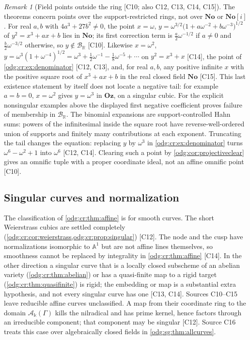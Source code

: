 \documentclass[11pt,oneside]{article}
\numberwithin{equation}{section}
\theoremstyle{definition}
\theoremstyle{remark}
\newtheorem{remark}[remark]{Remark}
\newcommand{\No}{\mathbf{No}}
\newcommand{\Oz}{\mathbf{Oz}}
\newcommand{\R}{\mathbb R}
\newcommand{\BR}{\mathcal B_{\R}}
\newcommand{\src}[1]{\textup{\textsf{\small[#1]}}}
\newcommand{\crA}{\mathcal A_\Bbbk(\Gamma)}
\newcommand{\Aff}{\mathbb A}
\begin{document}
\begin{remark}[Field points outside the ring \src{C10; also C12, C13, C14, C15}]\label{odg:cr:rem:fieldpoints}
The theorems concern points over the support-restricted rings, not over $\No$ or
$\No[i]$. For real $a,b$ with $4a^3+27b^2\ne0$, the point
$x=\omega$, $y=\omega^{3/2}\bigl(1+a\omega^{-2}+b\omega^{-3}\bigr)^{1/2}$ of
$y^2=x^3+ax+b$ lies in $\No$; its first correction term is
$\tfrac a2\omega^{-1/2}$ if $a\ne0$ and $\tfrac b2\omega^{-3/2}$ otherwise, so
$y\notin\BR$ \src{C10}. Likewise $x=\omega^2$,
$y=\omega^3(1+\omega^{-4})^{1/2}=\omega^3+\tfrac12\omega^{-1}-\tfrac18\omega^{-5}+\cdots$
on $y^2=x^3+x$ \src{C14}, the point of \cref{odg:cr:ex:denominator}
\src{C12, C13}, and, for real $a,b$, any positive infinite $x$ with the positive square
root of $x^3+ax+b$ in the real closed field $\No$ \src{C15}. This last existence
statement by itself does not locate a negative tail: for example $a=b=0$,
$x=\omega^2$ gives $y=\omega^3$ in $\Oz$, on a singular cubic. For the explicit
nonsingular examples above the displayed first negative coefficient proves
failure of membership in $\BR$. The binomial expansions are support-controlled
Hahn sums: powers of the infinitesimal inside the square root have
reverse-well-ordered union of supports and finitely many contributions at
each exponent. Truncating
the tail changes the equation: replacing $y$ by $\omega^3$ in
\cref{odg:cr:ex:denominator} turns $\omega^6-\omega^2+1$ into $\omega^6$
\src{C12, C14}. Clearing such a point by \cref{odg:cor:projectiveclear} gives an
omnific tuple with a proper coordinate ideal, not an affine omnific point
\src{C10}.
\end{remark}

\subsection{Singular curves and normalization}\label{odg:cr:sub:singular}

The classification of \cref{odg:cr:thm:affine} is for smooth curves. The short Weierstrass cubics are settled
completely (\cref{odg:cr:cor:weierstrass,odg:cr:prop:singular}) \src{C12}. The node
and the cusp have normalizations isomorphic to $\Aff^1$ but are not affine lines
themselves, so smoothness cannot be replaced by integrality in
\cref{odg:cr:thm:affine} \src{C14}. In the other direction a singular curve that is a
locally closed subscheme of an abelian variety (\cref{odg:cr:thm:abelian}) or has a
quasi-finite map to a rigid target (\cref{odg:cr:thm:quasifinite}) is rigid; the
embedding or map is a substantial extra hypothesis, and not every singular curve
has one \src{C13, C14}. Sources C10--C15 leave reducible affine curves
unclassified. A map from their coordinate ring to the domain $\crA$ kills the
nilradical and has prime kernel, hence factors through an irreducible component;
that component may be singular \src{C12}. Source C16 treats this case over
algebraically closed fields in \cref{odg:sg:thm:allcurves}.
\end{document}
